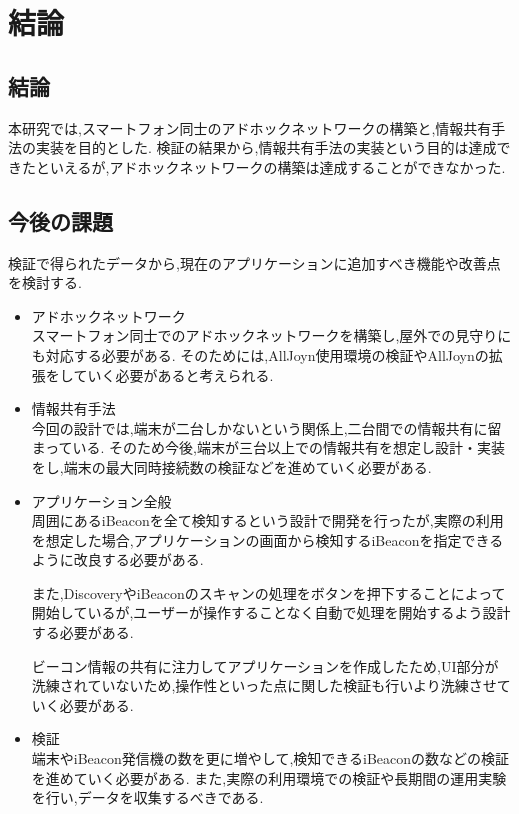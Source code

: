 \chapter{結論}
\section{結論}
本研究では,スマートフォン同士のアドホックネットワークの構築と,情報共有手法の実装を目的とした.
検証の結果から,情報共有手法の実装という目的は達成できたといえるが,アドホックネットワークの構築は達成することができなかった.

\section{今後の課題}
検証で得られたデータから,現在のアプリケーションに追加すべき機能や改善点を検討する.

\begin{itemize}
\item アドホックネットワーク \\
スマートフォン同士でのアドホックネットワークを構築し,屋外での見守りにも対応する必要がある.
そのためには,AllJoyn使用環境の検証やAllJoynの拡張をしていく必要があると考えられる.

\item 情報共有手法 \\
今回の設計では,端末が二台しかないという関係上,二台間での情報共有に留まっている.
そのため今後,端末が三台以上での情報共有を想定し設計・実装をし,端末の最大同時接続数の検証などを進めていく必要がある.

\item アプリケーション全般 \\
  周囲にあるiBeaconを全て検知するという設計で開発を行ったが,実際の利用を想定した場合,アプリケーションの画面から検知するiBeaconを指定できるように改良する必要がある.
  
  また,DiscoveryやiBeaconのスキャンの処理をボタンを押下することによって開始しているが,ユーザーが操作することなく自動で処理を開始するよう設計する必要がある.
  
  ビーコン情報の共有に注力してアプリケーションを作成したため,UI部分が洗練されていないため,操作性といった点に関した検証も行いより洗練させていく必要がある.

\item 検証 \\
端末やiBeacon発信機の数を更に増やして,検知できるiBeaconの数などの検証を進めていく必要がある.
また,実際の利用環境での検証や長期間の運用実験を行い,データを収集するべきである.


\end{itemize}



